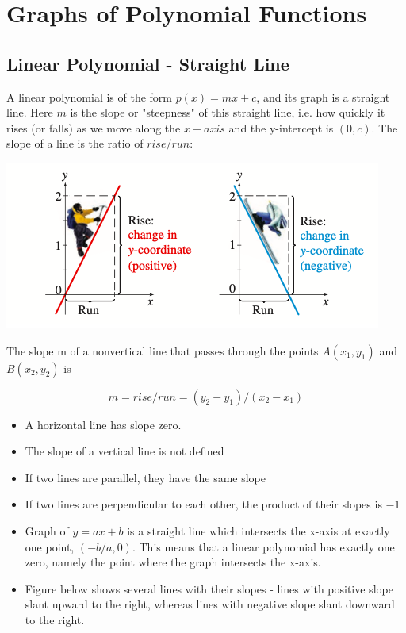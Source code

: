 \documentclass{book}
\begin{document}
	\chapter{Graphs of Polynomial Functions}
	\section{Linear Polynomial - Straight Line}
	A linear polynomial is of the form $p(x) = mx + c$, and its graph is a straight line. Here $m$ is the slope or "steepness" of this straight line, i.e. how quickly it rises (or falls) as we move along the $x-axis$ and the y-intercept is $(0,c)$. The slope of a line is the ratio of $rise/run$:
	
	\includegraphics[scale=0.7]{slope1}

	The slope m of a nonvertical line that passes through the points $A(x_1,y_1)$ and $B(x_2,y_2)$ is
	
	$$m = rise/run = (y_2-y_1)/(x_2-x_1)$$
	
	\begin{itemize}
		\item A horizontal line has slope zero.
		\item The slope of a vertical line is not defined
		\item If two lines are parallel, they have the same slope
		\item If two lines are perpendicular to each other, the product of their slopes is $-1$
		\item Graph of $y = ax + b$ is a straight line which intersects the x-axis at exactly one point, $(-b/a,0)$. This means that a linear polynomial has exactly one zero, namely the point where the graph intersects the x-axis.
		\item Figure below shows several lines with their slopes - lines with positive slope slant upward to the right, whereas lines with negative slope slant downward to the right.
	\end{itemize}
	
\end{document}
